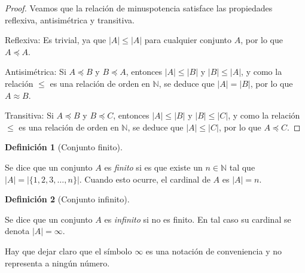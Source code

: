 \documentclass[
  a4paper,
]{scrreport}
\theoremstyle{definition}
\theoremstyle{plain}
\theoremstyle{plain}
\theoremstyle{definition}
\newtheorem{definition}{Definición}[chapter]
\theoremstyle{plain}
\theoremstyle{remark}
\begin{document}
\begin{tcolorbox}[enhanced jigsaw, toptitle=1mm, rightrule=.15mm, colbacktitle=quarto-callout-note-color!10!white, bottomtitle=1mm, breakable, leftrule=.75mm, titlerule=0mm, coltitle=black, opacityback=0, colback=white, toprule=.15mm, title=\textcolor{quarto-callout-note-color}{\faInfo}\hspace{0.5em}{Demostración}, arc=.35mm, bottomrule=.15mm, colframe=quarto-callout-note-color-frame, left=2mm, opacitybacktitle=0.6]

\begin{proof}

Veamos que la relación de minuspotencia satisface las propiedades
reflexiva, antisimétrica y transitiva.

Reflexiva: Es trivial, ya que \(|A|\leq |A|\) para cualquier conjunto
\(A\), por lo que \(A\preceq A\).

Antisimétrica: Si \(A\preceq B\) y \(B\preceq A\), entonces
\(|A|\leq |B|\) y \(|B|\leq |A|\), y como la relación \(\leq\) es una
relación de orden en \(\mathbb{N}\), se deduce que \(|A|=|B|\), por lo
que \(A\approx B\).

Transitiva: Si \(A\preceq B\) y \(B\preceq C\), entonces \(|A|\leq |B|\)
y \(|B|\leq |C|\), y como la relación \(\leq\) es una relación de orden
en \(\mathbb{N}\), se deduce que \(|A|\leq |C|\), por lo que
\(A\preceq C\).

\end{proof}

\end{tcolorbox}

\begin{definition}[Conjunto
finito]\protect\hypertarget{def-conjunto-finito}{}\label{def-conjunto-finito}

Se dice que un conjunto \(A\) es \emph{finito} si es que existe un
\(n\in\mathbb{N}\) tal que \(|A| = |\{1,2,3,\ldots,n \}|\). Cuando esto
ocurre, el cardinal de \(A\) es \(|A|=n\).

\end{definition}

\begin{definition}[Conjunto
infinito]\protect\hypertarget{def-conjunto-infinito}{}\label{def-conjunto-infinito}

Se dice que un conjunto \(A\) es \emph{infinito} si no es finito. En tal
caso su cardinal se denota \(|A|=\infty\).

\end{definition}

Hay que dejar claro que el símbolo \(\infty\) es una notación de
conveniencia y no representa a ningún número.
\end{document}
